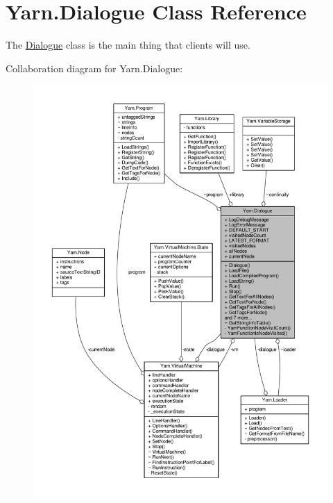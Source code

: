\hypertarget{a00090}{\section{Yarn.\-Dialogue Class Reference}
\label{a00090}
}


The \hyperlink{a00090}{Dialogue} class is the main thing that clients will use.  




Collaboration diagram for Yarn.\-Dialogue\-:
\nopagebreak
\begin{figure}[H]
\begin{center}
\leavevmode
\includegraphics[width=350pt]{a00590}
\end{center}
\end{figure}
